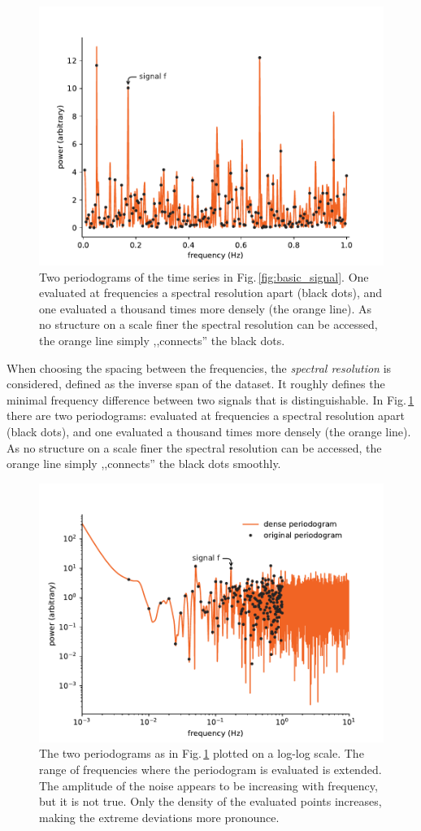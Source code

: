 \begin{figure}
  \centering \includegraphics[width=0.8\linewidth]{gfx/axions/basic_periodogram.pdf}
  \caption{Two periodograms of the time series in Fig.\,\ref{fig:basic_signal}. One evaluated at frequencies a spectral resolution apart (black dots), and one evaluated a thousand times more densely (the orange line). As no structure on a scale finer the spectral resolution can be accessed, the orange line simply ,,connects'' the black dots.}
  \label{fig:basic_periodogram}
\end{figure}

When choosing the spacing between the frequencies, the \emph{spectral resolution} is considered, defined as the inverse span of the dataset. It roughly defines the minimal frequency difference between two signals that is distinguishable. In Fig.\,\ref{fig:basic_periodogram} there are two periodograms: evaluated at frequencies a spectral resolution apart (black dots), and one evaluated a thousand times more densely (the orange line). As no structure on a scale finer the spectral resolution can be accessed, the orange line simply ,,connects'' the black dots smoothly.

\begin{figure}
  \centering \includegraphics[width=0.8\linewidth]{gfx/axions/basic_periodogram_loglog.pdf}
  \caption{The two periodograms as in Fig.\,\ref{fig:basic_periodogram} plotted on a log-log scale. The range of frequencies where the periodogram is evaluated is extended. The amplitude of the noise appears to be increasing with frequency, but it is not true. Only the density of the evaluated points increases, making the extreme deviations more pronounce.}
  \label{fig:basic_periodogram_loglog}
\end{figure}

